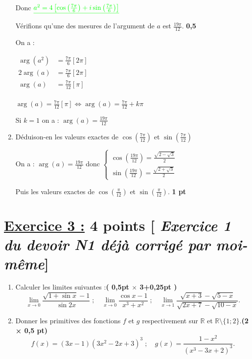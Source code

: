 \documentclass[12pt,a4paper]{article}
\begin{document}
\begin{enumerate}
     Donc $\textcolor{green}{\underline{a^2 = 4\left[ \cos\left( \frac{7\pi}{6}\right) +i\sin\left( \frac{7\pi}{6}\right)  \right]}} $
     
    Vérifions qu’une des mesures de l’argument de $a$ est $\frac{19\pi}{12}$. \hfill \textbf{0,5}
    
    On a :
     
     $
     \begin{aligned}
		\arg(a^2)&=\frac{7\pi}{6}[2\pi]\\
		2\arg(a)&=\frac{7\pi}{6}[2\pi]\\
		\arg(a)&=\frac{7\pi}{12}[\pi]\\
     \end{aligned}
     $

$ \arg(a)=\frac{7\pi}{12}[\pi] \Leftrightarrow \arg(a)=\frac{7\pi}{12}+k\pi $

Si $k=1$ on a : $\arg(a)=\frac{19\pi}{12}$
    \item Déduison-en les valeurs exactes de $\cos\left(\frac{7\pi}{12}\right)$ et $\sin\left(\frac{7\pi}{12}\right)$

	    On a : $ \arg(a)=\frac{19\pi}{12} $ donc 
	    $
	    \begin{cases}
	    \cos\left(\frac{19\pi}{12}\right)=\frac{\sqrt{2 - \sqrt{3}}}{2}\\
	    \sin\left(\frac{19\pi}{12}\right)=\frac{\sqrt{2 + \sqrt{3}}}{2}
	    \end{cases}
	     $
    
    Puis les valeurs exactes de $\cos\left(\frac{\pi}{12}\right)$ et $\sin\left(\frac{\pi}{12}\right)$. \hfill \textbf{1 pt}

\end{enumerate}
\section*{\underline{Exercice 3 :} 4 points [\textit{ Exercice 1  du devoir N1 déjà  corrigé par moi-même}]}

\begin{enumerate}
    \item Calculer les limites suivantes :\hfill \textbf{( 0,5pt $\times$ 3+0,25pt )}
    \[
    \lim_{x \to 0} \frac{\sqrt{1+\sin x} - 1}{\sin 2x} \; ; \quad
    \lim_{x \to 0} \frac{\cos x - 1}{x^3 + x^2} \; ; \quad
    \lim_{x \to 1} \frac{\sqrt{x + 3} - \sqrt{5 - x}}{\sqrt{2x + 7} - \sqrt{10 - x}}.
    \]
    \item Donner les primitives des fonctions \(f\) et \(g\) respectivement sur \(\mathbb{R}\) et \(\mathbb{R} \setminus \{1; 2\}\).\hfill \textbf{(2 × 0,5 pt)}
    \[
    f(x) = (3x-1)(3x^2-2x+3)^3 \; ; \quad
    g(x) = \frac{1-x^2}{(x^3-3x+2)^3}.
    \]
\end{enumerate}
\end{document}
